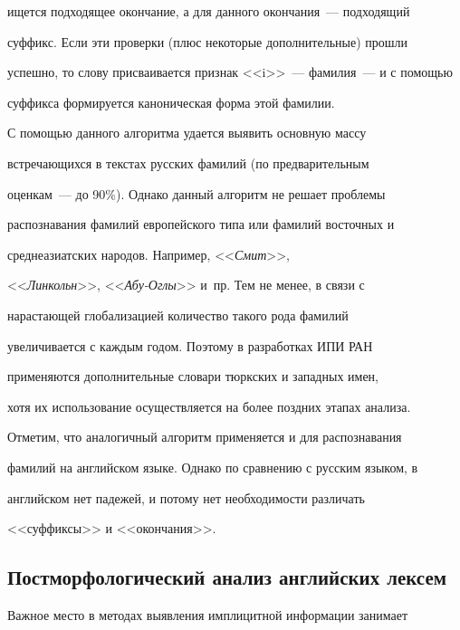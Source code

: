 ищется  подходящее окончание, а для данного окончания~--- подходящий 


суффикс. Если эти проверки (плюс некоторые дополнительные) прошли 


успешно, то слову присваивается признак <<i>>~--- фамилия~--- и с помощью 


суффикса формируется каноническая форма этой фамилии. 


   


   С помощью данного алгоритма удается выявить основную массу 


встре\-ча\-ющих\-ся в текстах русских фамилий (по предварительным 


   оценкам~--- до 90\%). Однако данный алгоритм не решает проблемы 


распознавания фамилий европейского типа или фамилий восточных и 


среднеазиатских народов. Например, <<\textit{Смит}>>, 


<<\textit{Линкольн}>>, <<\textit{Абу-Оглы}>> и~пр. Тем не менее, в связи с 


нарастающей глобализацией количество такого рода фамилий 


увеличивается с каждым годом. Поэтому в разработках ИПИ РАН 


применяются дополнительные словари тюркских и западных имен, 


хотя их использование осуществляется на более поздних этапах анализа.


   


   Отметим, что аналогичный алгоритм применяется и для распознавания  


фамилий на английском языке. Однако по сравнению с русским языком, в 


английском нет падежей, и потому нет необходимости различать 


<<суффиксы>> и <<окончания>>. 


   


   \subsection{Постморфологический анализ английских лексем}


   


   Важное место в методах выявления имплицитной информации занимает 


